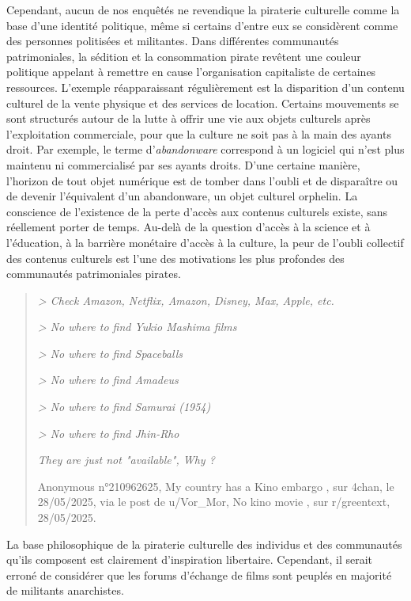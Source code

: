 Cependant, aucun de nos enquêtés ne revendique la piraterie culturelle comme la base d'une identité politique, même si certains d'entre eux se considèrent comme des personnes politisées et militantes. Dans différentes communautés patrimoniales, la sédition et la consommation pirate revêtent une couleur politique appelant à remettre en cause l'organisation capitaliste de certaines ressources. L'exemple réapparaissant régulièrement est la disparition d'un contenu culturel de la vente physique et des services de location. Certains mouvements se sont structurés autour de la lutte à offrir une vie aux objets culturels après l'exploitation commerciale, pour que la culture ne soit pas à la main des ayants droit. Par exemple, le terme d'\textit{abandonware} correspond à un logiciel qui n'est plus maintenu ni commercialisé par ses ayants droits. D'une certaine manière, l'horizon de tout objet numérique est de tomber dans l'oubli et de disparaître ou de devenir l'équivalent d'un abandonware, un objet culturel orphelin. La conscience de l'existence de la perte d'accès aux contenus culturels existe, sans réellement porter de temps. Au-delà de la question d'accès à la science et à l'éducation, à la barrière monétaire d'accès à la culture, la peur de l'oubli collectif des contenus culturels est l'une des motivations les plus profondes des communautés patrimoniales pirates.

\begin{quote}
\textit{    > Check Amazon, Netflix, Amazon, Disney, Max, Apple, etc.}

\textit{    > No where to find Yukio Mashima films
}

\textit{    > No where to find Spaceballs
}

\textit{    > No where to find Amadeus
}

\textit{    > No where to find Samurai (1954)
}

\textit{    > No where to find Jhin-Rho 
}

\textit{    They are just not "available", Why ?
}

    Anonymous n°210962625, \og My country has a Kino embargo \fg, sur 4chan, le 28/05/2025, via le post de u/Vor\_Mor, \og  No kino movie \fg, sur r/greentext, 28/05/2025.
\end{quote}

La base philosophique de la piraterie culturelle des individus et des communautés qu'ils composent est clairement d'inspiration libertaire. Cependant, il serait erroné de considérer que les forums d'échange de films sont peuplés en majorité de militants anarchistes. %


